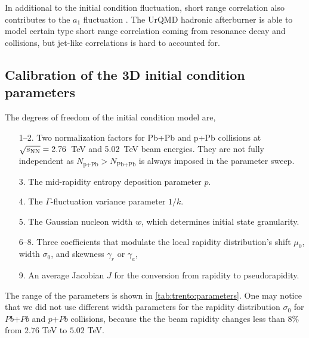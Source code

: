 In additional to the initial condition fluctuation, short range correlation also contributes to the $a_1$ fluctuation \cite{Denicol:2015bnf}.
The UrQMD hadronic afterburner is able to model certain type short range correlation coming from resonance decay and collisions, but jet-like correlations is hard to accounted for.

\subsection{Calibration of the 3D initial condition parameters}
The degrees of freedom of the initial condition model are,
\begin{itemize}[itemsep=0pt]
  \item[1--2.] Two normalization factors for Pb+Pb and p+Pb collisions at $\sqrt{s_\mathrm{NN}}=2.76$~TeV and 5.02~TeV beam energies. They are not fully independent as $N_{\textrm{p+Pb}} > N_{\textrm{Pb+Pb}}$ is always imposed in the parameter sweep.
  \item[3.] The mid-rapidity entropy deposition parameter $p$.
  \item[4.] The $\Gamma$-fluctuation variance parameter $1/k$.
  \item[5.] The Gaussian nucleon width $w$, which determines initial state granularity.
  \item[6--8.] Three coefficients that modulate the local rapidity distribution's shift $\mu_0$, width $\sigma_0$, and skewness $\gamma_r$ or $\gamma_a$,
  \item[9.] An average Jacobian $J$ for the conversion from rapidity to pseudorapidity.
\end{itemize}
The range of the parameters is shown in \ref{tab:trento:parameters}.
One may notice that we did not use different width parameters for the rapidity distribution $\sigma_0$ for $Pb$+$Pb$ and $p$+$Pb$ collisions, because the the beam rapidity changes less than $8\%$ from $2.76$ TeV to $5.02$ TeV.

